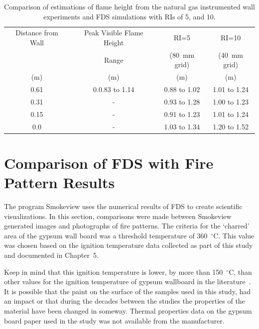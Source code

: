 \documentclass[twoside]{uocthesis}
\begin{document}
{\begin{table}[h]
  \small
  \centering
  \begin{tabular}{|c|c|c|c|} \hline 
Distance from Wall 		&  Peak Visible Flame Height 			  	& RI=5       		& RI=10      		  \\
    					&  Range          				&  (80~mm grid)  	&  (40~mm grid)  	  \\
    (m)					&  (m) 							& (m) 				& (m) 				  \\ 
\hline    0.61			&  0.0.83 to 1.14         		& 0.88 to 1.02      & 1.01 to 1.24         \\
\hline    0.31			&		-						& 0.93 to 1.28		& 1.00 to 1.23		    \\
\hline    0.15			&		-						& 0.91 to 1.23		& 1.01 to 1.24			\\
\hline	  0.0			&		-						& 1.03 to 1.34		& 1.20 to 1.52   	  \\
\hline
  \end{tabular}
  \caption[Comparison of estimations of flame height from the natural gas instrumented wall experiments and FDS simulations with RIs of 5 and 10.]{Comparison of estimations of flame height from the natural gas instrumented wall experiments and FDS simulations with RIs of 5, and 10.}
  \label{tab:FDS_FH_IWNG}
\end{table}

\section{Comparison of FDS with Fire Pattern Results}

The program Smokeview uses the numerical results of FDS to create scientific visualizations.  In this section, comparisons were made between Smokeview generated images and photographs of fire patterns. The criteria for the `charred' area of the gypsum wall board was a threshold temperature of 360~$^\circ$C.  This value was chosen based on the ignition temperature data collected as part of this study and documented in Chapter~5. 

Keep in mind that this ignition temperature is lower, by more than 150~$^\circ$C, than other values for the ignition temperature of gypsum wallboard in the literature~\cite{Dillon:1998,Babrauskas:2003}.  It is possible that the paint on the surface of the samples used in this study, had an impact or that during the decades between the studies the properties of the material have been changed in someway.  Thermal properties data on the gypsum board paper used in the study was not available from the manufacturer.  

}
\end{document}
